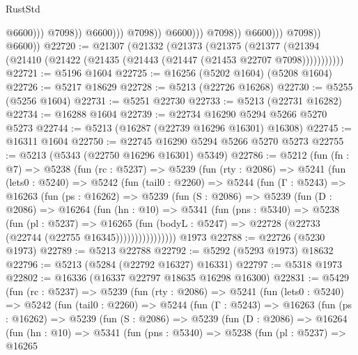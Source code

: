 \begin{lexlean}{RustStd}
\begin{coremodule}
                                                @6600)))
                                          @7098))
                                      @6600)))
                                @7098))
                            @6600)))
                      @7098))
                  @6600)))
            @7098))
        @6600))
@22720 := @21307
    (@21332
      (@21373
        (@21375
          (@21377 (@21394 (@21410 (@21422 (@21435 (@21443 (@21447 (@21453 @22707 @7098)))))))))))
@22721 := @5196 @1604
@22725 := @16256 (@5202 @1604) (@5208 @1604)
@22726 := @5217 @18629
@22728 := @5213 (@22726 @16268)
@22730 := @5255 (@5256 @1604)
@22731 := @5251 @22730
@22733 := @5213 (@22731 @16282)
@22734 := @16288 @1604
@22739 := @22734 @16290 @5294 @5266 @5270 @5273
@22744 := @5213 (@16287 (@22739 @16296 @16301) @16308)
@22745 := @16311 @1604
@22750 := @22745 @16290 @5294 @5266 @5270 @5273
@22755 := @5213 (@5343 (@22750 @16296 @16301) @5349)
@22786 := @5212
    (fun (fn : @7) =>
    @5238
      (fun (rc : @5237) =>
      @5239
        (fun (rty : @2086) =>
        @5241
          (fun (lets0 : @5240) =>
          @5242
            (fun (tail0 : @2260) =>
            @5244
              (fun (Γ : @5243) =>
              @16263
                (fun (ps : @16262) =>
                @5239
                  (fun (S : @2086) =>
                  @5239
                    (fun (D : @2086) =>
                    @16264
                      (fun (hn : @10) =>
                      @5341
                        (fun (pns : @5340) =>
                        @5238
                          (fun (pl : @5237) =>
                          @16265
                            (fun (bodyL : @5247) =>
                            @22728 (@22733 (@22744 (@22755 @16345))))))))))))))))
    @1973
@22788 := @22726 (@5230 @1973)
@22789 := @5213 @22788
@22792 := @5292 (@5293 @1973) @18632
@22796 := @5213 (@5284 (@22792 @16327) @16331)
@22797 := @5318 @1973
@22802 := @16336 (@16337 @22797 @18635 @16298 @16300)
@22831 := @5429
    (fun (rc : @5237) =>
    @5239
      (fun (rty : @2086) =>
      @5241
        (fun (lets0 : @5240) =>
        @5242
          (fun (tail0 : @2260) =>
          @5244
            (fun (Γ : @5243) =>
            @16263
              (fun (ps : @16262) =>
              @5239
                (fun (S : @2086) =>
                @5239
                  (fun (D : @2086) =>
                  @16264
                    (fun (hn : @10) =>
                    @5341
                      (fun (pns : @5340) =>
                      @5238
                        (fun (pl : @5237) =>
                        @16265

\end{coremodule}
\end{lexlean}
